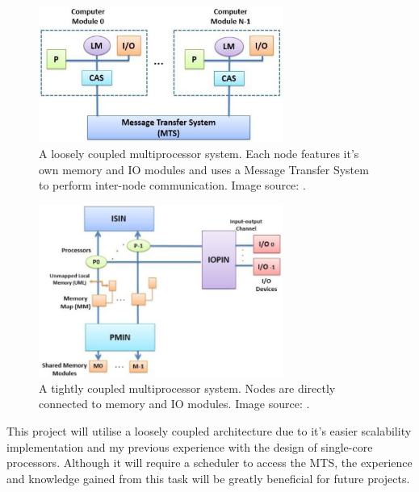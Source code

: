\begin{minipage}{0.45\textwidth}
\begin{figure}[H]
\centering
\includegraphics[width=8cm]{../img/loose}
\caption{A loosely coupled multiprocessor system. Each node features it's own memory and IO modules and uses a Message Transfer System to perform inter-node communication. Image source: \cite{preeti_aritra_2017}.}
\label{fig:loose}
\end{figure}
\end{minipage}
\begin{minipage}{0.05\textwidth}\hfill\end{minipage}
\begin{minipage}{0.45\textwidth}
\begin{figure}[H]
\centering
\includegraphics[width=8cm]{../img/tight}
\caption{A tightly coupled multiprocessor system. Nodes are directly connected to memory and IO modules. Image source: \cite{preeti_aritra_2017}.}
\label{fig:tight}
\end{figure}
\end{minipage}
\vspace{0.3cm}

This project will utilise a loosely coupled architecture due to it's easier scalability implementation and my previous experience with the design of single-core processors. Although it will require a scheduler to access the MTS, the experience and knowledge gained from this task will be greatly beneficial for future projects.

